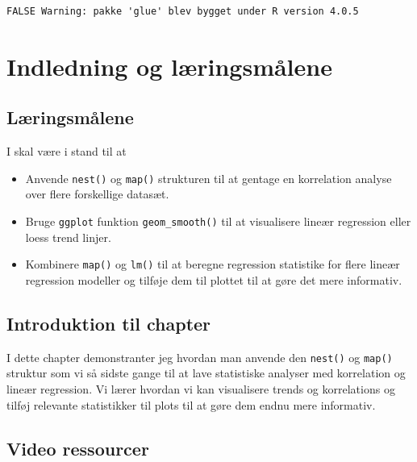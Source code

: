 \documentclass[
]{book}
\providecommand{\tightlist}{%
  \setlength{\itemsep}{0pt}\setlength{\parskip}{0pt}}
\begin{document}
\begin{verbatim}
FALSE Warning: pakke 'glue' blev bygget under R version 4.0.5
\end{verbatim}

\hypertarget{indledning-og-luxe6ringsmuxe5lene-1}{%
\section{Indledning og læringsmålene}\label{indledning-og-luxe6ringsmuxe5lene-1}}

\hypertarget{luxe6ringsmuxe5lene-3}{%
\subsection{Læringsmålene}\label{luxe6ringsmuxe5lene-3}}

I skal være i stand til at

\begin{itemize}
\tightlist
\item
  Anvende \texttt{nest()} og \texttt{map()} strukturen til at gentage en korrelation analyse over flere forskellige datasæt.
\item
  Bruge \texttt{ggplot} funktion \texttt{geom\_smooth()} til at visualisere lineær regression eller loess trend linjer.
\item
  Kombinere \texttt{map()} og \texttt{lm()} til at beregne regression statistike for flere lineær regression modeller og tilføje dem til plottet til at gøre det mere informativ.
\end{itemize}

\hypertarget{introduktion-til-chapter-1}{%
\subsection{Introduktion til chapter}\label{introduktion-til-chapter-1}}

I dette chapter demonstranter jeg hvordan man anvende den \texttt{nest()} og \texttt{map()} struktur som vi så sidste gange til at lave statistiske analyser med korrelation og lineær regression. Vi lærer hvordan vi kan visualisere trends og korrelations og tilføj relevante statistikker til plots til at gøre dem endnu mere informativ.

\hypertarget{video-ressourcer-4}{%
\subsection{Video ressourcer}\label{video-ressourcer-4}}
\end{document}
